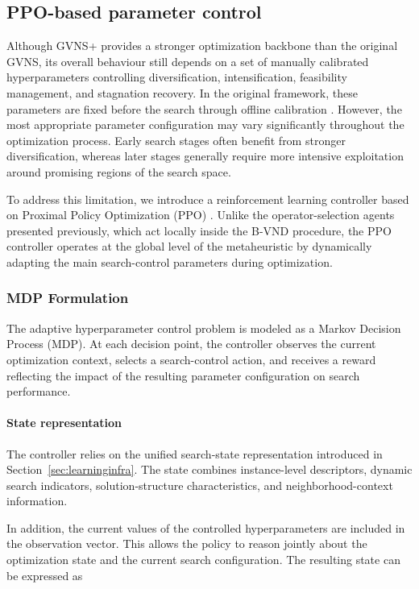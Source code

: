 \subsection{PPO-based parameter control}
\label{sec:ppo}

Although GVNS+ provides a stronger optimization backbone than the original GVNS, its overall behaviour still depends on a set of manually calibrated hyperparameters controlling diversification, intensification, feasibility management, and stagnation recovery. In the original framework, these parameters are fixed before the search through offline calibration \cite{masmoudi2025generalized}. However, the most appropriate parameter configuration may vary significantly throughout the optimization process. Early search stages often benefit from stronger diversification, whereas later stages generally require more intensive exploitation around promising regions of the search space.

To address this limitation, we introduce a reinforcement learning controller based on Proximal Policy Optimization (PPO) \cite{schulman2017proximal}. Unlike the operator-selection agents presented previously, which act locally inside the B-VND procedure, the PPO controller operates at the global level of the metaheuristic by dynamically adapting the main search-control parameters during optimization.

\subsubsection{MDP Formulation}
The adaptive hyperparameter control problem is modeled as a Markov Decision Process (MDP). At each decision point, the controller observes the current optimization context, selects a search-control action, and receives a reward reflecting the impact of the resulting parameter configuration on search performance.

\paragraph{State representation}
The controller relies on the unified search-state representation introduced in Section~\ref{sec:learninginfra}. The state combines instance-level descriptors, dynamic search indicators, solution-structure characteristics, and neighborhood-context information.

In addition, the current values of the controlled hyperparameters are included in the observation vector. This allows the policy to reason jointly about the optimization state and the current search configuration. The resulting state can be expressed as

